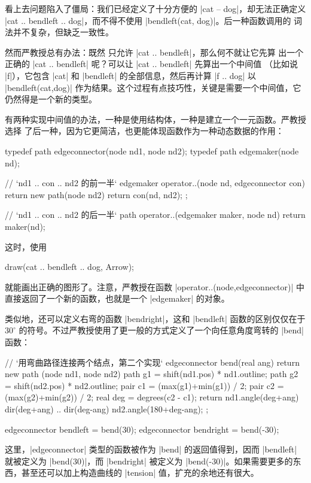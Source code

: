 看上去问题陷入了僵局：我们已经定义了十分方便的 |cat -- dog|，却无法正确定义
|cat .. bendleft .. dog|，而不得不使用 |bendleft(cat, dog)|。后一种函数调用的
词法并不复杂，但缺乏一致性。

然而严教授总有办法：既然 \Asy{} 只允许 |cat .. bendleft|，那么何不就让它先算
出一个正确的 |cat .. bendleft| 呢？可以让 |cat .. bendleft| 先算出一个中间值
（比如说 |f|），它包含 |cat| 和 |bendleft| 的全部信息，然后再计算 |f .. dog|
以 |bendleft(cat,dog)| 作为结果。这个过程有点技巧性，关键是需要一个中间值，它
仍然得是一个新的类型。

有两种实现中间值的办法，一种是使用结构体，一种是建立一个一元函数。严教授选择
了后一种，因为它更简洁，也更能体现函数作为一种动态数据的作用：
\begin{asycode}
typedef path edgeconnector(node nd1, node nd2);
typedef path edgemaker(node nd);

// `\color{comment}nd1 .. con .. nd2 的前一半`
edgemaker operator..(node nd, edgeconnector con)
{
    return new path(node nd2) {
        return con(nd, nd2);
    };
}

// `\color{comment}nd1 .. con .. nd2 的后一半`
path operator..(edgemaker maker, node nd)
{
    return maker(nd);
}
\end{asycode}
这时，使用
\begin{asycode}
draw(cat .. bendleft .. dog, Arrow);
\end{asycode}
就能画出正确的图形了。注意，严教授在函数 |operator..(node,edgeconnector)| 中
直接返回了一个新的函数，也就是一个 |edgemaker| 的对象。

类似地，还可以定义右弯的函数 |bendright|，这和 |bendleft| 函数的区别仅仅在于
$30^\circ$ 的符号。不过严教授使用了更一般的方式定义了一个向任意角度弯转的
|bend| 函数：
\begin{asycode}
// `\color{comment}用弯曲路径连接两个结点，第二个实现`
edgeconnector bend(real ang)
{
    return new path (node nd1, node nd2) {
        path g1 = shift(nd1.pos) * nd1.outline;
        path g2 = shift(nd2.pos) * nd2.outline;
        pair c1 = (max(g1)+min(g1)) / 2;
        pair c2 = (max(g2)+min(g2)) / 2;
        real deg = degrees(c2 - c1);
        return nd1.angle(deg+ang) {dir(deg+ang)}
            .. {dir(deg-ang)} nd2.angle(180+deg-ang);
    };
}

edgeconnector bendleft = bend(30);
edgeconnector bendright = bend(-30);
\end{asycode}
这里，|edgeconnector| 类型的函数被作为 |bend| 的返回值得到，因而 |bendleft| 
就被定义为 |bend(30)|，而 |bendright| 被定义为 |bend(-30)|。如果需要更多的东
西，甚至还可以加上构造曲线的 |tension| 值，扩充的余地还有很大。

